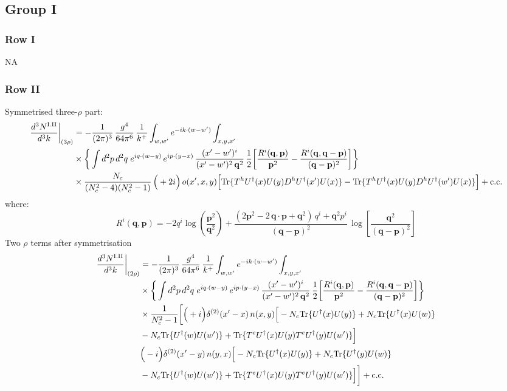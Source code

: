 \documentclass[9pt]{article}
\numberwithin{equation}{section}
\begin{document}
\subsection{Group I}
\subsubsection*{Row I}
\textsc{NA}
\subsubsection*{Row II}
Symmetrised three-$\rho$ part:
\begin{align}
\frac{d^{3}N^{\rm I.II}}{d^{3}k}\bigg|_{(3\rho)}&=-\frac{1}{(2\pi)^{3}}\,\frac{g^{4}}{64\pi^{6}}\,\frac{1}{k^{+}}\int_{w,w'}e^{-ik\cdot(w-w')}\int_{x,y,x'}\notag\\
&\times\bigg\{\int d^{2}p\,d^{2}q\;e^{iq\cdot(w-y)}\,e^{ip\cdot(y-x)}\,\frac{(x'-w')^{i}}{(x'-w')^{2}\,\mathbf{q}^{2}}\,\frac{1}{2}\bigg[\frac{R^{i}(\mathbf{q},\mathbf{p})}{\mathbf{p}^{2}}-\frac{R^{i}(\mathbf{q},\mathbf{q}-\mathbf{p})}{(\mathbf{q}-\mathbf{p})^{2}}\bigg]\bigg\}\notag\\
&\times \frac{N_{c}}{(N_{c}^{2}-4)(N_{c}^{2}-1)}\,\Big(+2i\Big)\,o(x',x,y)\Big[{\rm Tr}\{T^{h}U^{\dagger}(x)U(y)D^{h}U^{\dagger}(x')U(x)\}-{\rm Tr}\{T^{h}U^{\dagger}(x)U(y)D^{h}U^{\dagger}(w')U(x)\}\Big]+{\rm c.c.}\label{eq:E-I.II-3}
\end{align}
where: $$R^{i}(\mathbf{q},\mathbf{p})  = -2q^{i}\log\left(\frac{\mathbf{p}^{2}}{\mathbf{q}^{2}}\right)+\frac{(2\mathbf{p}^{2}-2\,\mathbf{q}\cdot\mathbf{p}+\mathbf{q}^{2})\,q^{i}+\mathbf{q}^{2}p^{i}}{(\mathbf{q}-\mathbf{p})^{2}}\,\log\left[\frac{\mathbf{q}^{2}}{(\mathbf{q}-\mathbf{p})^{2}}\right]$$
Two $\rho$ terms after symmetrisation
\begin{align}
\frac{d^{3}N^{\rm I.II}}{d^{3}k}\bigg|_{(2\rho)}&=-\frac{1}{(2\pi)^{3}}\,\frac{g^{4}}{64\pi^{6}}\,\frac{1}{k^{+}}\int_{w,w'}e^{-ik\cdot(w-w')}\int_{x,y,x'}\notag\\
&\times\bigg\{\int d^{2}p\,d^{2}q\;e^{iq\cdot(w-y)}\,e^{ip\cdot(y-x)}\,\frac{(x'-w')^{i}}{(x'-w')^{2}\,\mathbf{q}^{2}}\,\frac{1}{2}\bigg[\frac{R^{i}(\mathbf{q},\mathbf{p})}{\mathbf{p}^{2}}-\frac{R^{i}(\mathbf{q},\mathbf{q}-\mathbf{p})}{(\mathbf{q}-\mathbf{p})^{2}}\bigg]\bigg\}\notag\\
&\times \frac{1}{N_{c}^{2}-1}\bigg[\Big(+i\Big)\delta^{(2)}(x'-x)\,n(x,y)\Big[-N_{c}{\rm Tr}\{U^{\dagger}(x)U(y)\}+N_{c}{\rm Tr}\{U^{\dagger}(x)U(w)\}\notag\\
& -N_{c}{\rm Tr}\{U^{\dagger}(w)U(w')\}+{\rm Tr}\{T^{e}U^{\dagger}(x)U(y)T^{e}U^{\dagger}(y)U(w')\}\Big]\notag\\
& \Big(-i\Big)\delta^{(2)}(x'-y)\,n(y,x)\Big[-N_{c}{\rm Tr}\{U^{\dagger}(x)U(y)\}+N_{c}{\rm Tr}\{U^{\dagger}(y)U(w)\}\notag\\
& -N_{c}{\rm Tr}\{U^{\dagger}(w)U(w')\}+{\rm Tr}\{T^{e}U^{\dagger}(x)U(y)T^{e}U^{\dagger}(y)U(w')\}\Big]\bigg]+{\rm c.c.}\label{eq:E-I.II-2}
\end{align}
\end{document}
